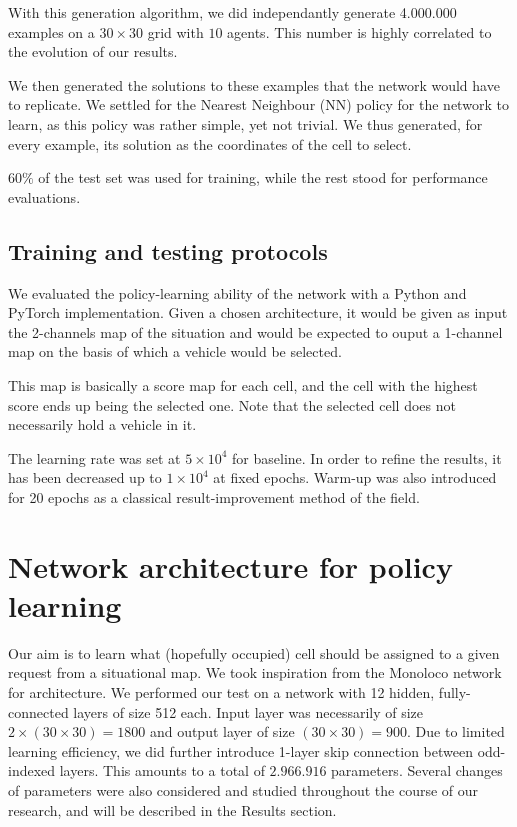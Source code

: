 \documentclass{article}
\begin{document}
With this generation algorithm, we did independantly generate 4.000.000 examples on a $30\times 30$ grid with $10$ agents.
This number is highly correlated to the evolution of our results.


We then generated the solutions to these examples that the network would have to replicate.
We settled for the Nearest Neighbour (NN) policy for the network to learn, as this policy was rather simple, yet not trivial.
We thus generated, for every example, its solution as the coordinates of the cell to select.

$60\%$ of the test set was used for training, while the rest stood for performance evaluations.

\subsection{Training and testing protocols}

We evaluated the policy-learning ability of the network with a Python and PyTorch implementation.
Given a chosen architecture, it would be given as input the 2-channels map of the situation and would be expected to ouput a 1-channel map on the basis of which a vehicle would be selected.

This map is basically a score map for each cell, and the cell with the highest score ends up being the selected one.
Note that the selected cell does not necessarily hold a vehicle in it.


The learning rate was set at $5\times 10^4$ for baseline. 
In order to refine the results, it has been decreased up to $1 \times  10^4$ at fixed epochs.
Warm-up was also introduced for 20 epochs as a classical result-improvement method of the field.


\section{Network architecture for policy learning}

Our aim is to learn what (hopefully occupied) cell should be assigned to a given request from a situational map.
We took inspiration from the Monoloco network for architecture. %
We performed our test on a network with 12 hidden, fully-connected layers of size 512 each. 
Input layer was necessarily of size $ 2 \times (30\times 30) = 1800$ and output layer of size $(30\times 30) = 900$.
Due to limited learning efficiency, we did further introduce 1-layer skip connection between odd-indexed layers.
This amounts to a total of $2.966.916$ parameters.
Several changes of parameters were also considered and studied throughout the course of our research, and will be described in the Results section.
\end{document}
